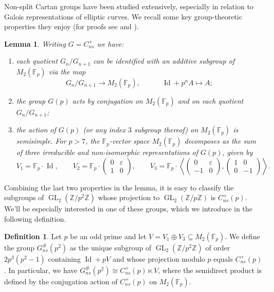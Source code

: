 \documentclass{amsart}
\newtheorem{lemma}[theorem]{Lemma}
\theoremstyle{definition}
\newtheorem{definition}[theorem]{Definition}
\newcommand{\Z}{\mathbb{Z}}
\newcommand{\F}{\mathbb{F}}
\newcommand{\GL}{\operatorname{GL}}
\numberwithin{theorem}{section}
\numberwithin{equation}{section}
\begin{document}
Non-split Cartan groups have been studied extensively, especially in relation to Galois representations of elliptic curves. We recall some key group-theoretic properties they enjoy (for proofs see \cite[Lemma 2.4]{zywina2011boundsserresopenimage} and \cite[\S 3.1]{furio24}).

\begin{lemma}\label{lemma: conjugacy action of Cnsp}
    Writing $G=C_{ns}^+$ we have:
\begin{enumerate}
    \item each quotient $G_n /G_{n+1}$ can be identified with an additive subgroup of $M_{2}(\F_p)$ via the map
    \[
    G_n/G_{n+1} \to  M_{2}(\F_p), \quad\qquad \operatorname{Id}+p^n A  \mapsto  A;
    \]
    \item the group $G(p)$ acts by conjugation on $M_{2}(\F_p)$ and on each quotient $G_n/G_{n+1}$;
    \item the action of $G(p)$ (or any index $3$ subgroup thereof) on $M_{2}(\F_p)$ is semisimple. For $p>7$, the $\F_p$-vector space $M_{2}(\F_p)$ decomposes as the sum of three irreducible and non-isomorphic representations of $G(p)$, given by
    \[
    V_1=\mathbb{F}_p \cdot \operatorname{Id}, \qquad V_2=\mathbb{F}_p \cdot \begin{pmatrix}
        0 & \varepsilon \\ 1 & 0
    \end{pmatrix}, \qquad V_3=\F_p \cdot \left\langle \begin{pmatrix}
        0 & \varepsilon \\ -1 & 0
    \end{pmatrix}, \begin{pmatrix}
        1 & 0 \\ 0 & -1
    \end{pmatrix} \right\rangle.
    \]
\end{enumerate}
\end{lemma}

Combining the last two properties in the lemma, it is easy to classify the subgroups of $\GL_2(\Z/p^2\Z)$ whose projection to $\GL_2(\Z/p\Z)$ is $C_{ns}^+(p)$. We'll be especially interested in one of these groups, which we introduce in the following definition.


\begin{definition}\label{def: ciuffetto}
Let $p$ be an odd prime and let $V = V_1 \oplus V_3 \subseteq M_{2}(\F_p)$. 
We define the group $G_{ns}^\#(p^2)$ as the unique subgroup of $\GL_2(\Z/p^2\Z)$ of order $2p^3(p^2-1)$ containing $\operatorname{Id}+pV$ and whose projection modulo $p$ equals $C_{ns}^+(p)$. In particular, we have $G_{ns}^\#(p^2) \cong C_{ns}^+(p) \ltimes V$, where the semidirect product is defined by the conjugation action of $C_{ns}^+(p)$ on $M_{2}(\F_p)$.
\end{definition}
\end{document}
